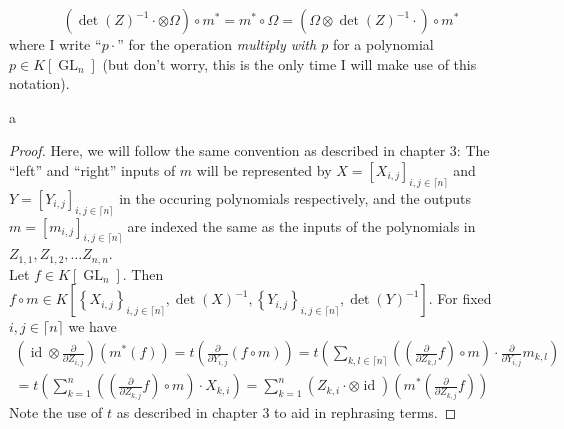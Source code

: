 \begin{lemma}
  \begin{equation}
    \left( \operatorname{det} \left( Z \right) ^{-1} \cdot \otimes \Omega \right) \circ m^\ast
    = m^\ast \circ \Omega
    = \left( \Omega \otimes \operatorname{det} \left( Z \right) ^{-1} \cdot \right) \circ m^\ast
  \end{equation}
  where I write ``$ p \cdot $'' for the operation \textit{multiply with $ p $} for a polynomial $ p \in K \left\lbrack \operatorname{GL}_n \right\rbrack $ (but don't worry, this is the only time I will make use of this notation).
\end{lemma}
a
\begin{proof}
  Here, we will follow the same convention as described in chapter 3: The ``left'' and ``right'' inputs of $ m $ will be represented by $ X = \left\lbrack X_{i,j} \right\rbrack_{i,j \in \lceil n \rceil} $ and $ Y = \left\lbrack Y_{i,j} \right\rbrack_{i,j \in \lceil n \rceil} $ in the occuring polynomials respectively, and the outputs $ m = \left\lbrack m_{i,j} \right\rbrack_{i,j \in \lceil n \rceil} $ are indexed the same as the inputs of the polynomials in $ Z_{1,1} , Z_{1,2} , \ldots Z_{n,n} $.\\
  Let $f \in K \left\lbrack \operatorname{GL}_n \right\rbrack $.
  Then $ f \circ m \in K \left\lbrack \left\{ X_{i,j} \right\}_{i,j \in \lceil n \rceil} , \operatorname{det} \left( X \right)^{-1} , \left\{ Y_{i,j} \right\}_{i,j \in \lceil n \rceil} , \operatorname{det} \left( Y \right)^{-1} \right\rbrack $.
  For fixed $i,j \in \lceil n \rceil $ we have
  \begin{equation}
    \begin{aligned}
    \left( \operatorname{id} \otimes \frac{\partial}{\partial Z_{i,j}} \right) \left( m^\ast \left( f \right) \right) 
    = t \left( \frac{\partial}{\partial Y_{i,j}} \left( f \circ m \right) \right) 
    = t \left( \sum_{k,l \in \lceil n \rceil} \left( \left( \frac{\partial}{\partial Z_{k,l}} f \right) \circ m \right) \cdot \frac{\partial}{\partial Y_{i,j}} m_{k,l} \right) \\
    = t \left( \sum_{k = 1}^n \left( \left( \frac{\partial}{\partial Z_{k,j}} f \right) \circ m \right) \cdot X_{k,i} \right) 
    = \sum_{k=1}^n \left( Z_{k,i} \cdot \otimes \operatorname{id} \right) \left( m^\ast \left( \frac{\partial}{\partial Z_{k,j}} f \right) \right)
    \end{aligned}
  \end{equation}
  Note the use of $ t $ as described in chapter 3 to aid in rephrasing terms.

\end{proof}
